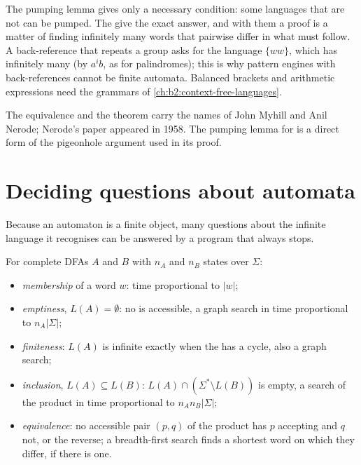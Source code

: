 The pumping lemma gives only a necessary condition: some languages that are not  can be pumped. The 
give the exact answer, and with them a proof is a matter of finding infinitely many words that pairwise differ in what
must follow. A back-reference that repeats a group asks for the language $\{ww\}$, which has infinitely many 
(by $a^ib$, as for palindromes); this is why pattern engines with back-references cannot be finite automata. Balanced
brackets and arithmetic expressions need the grammars of \cref{ch:b2:context-free-languages}.

\begin{history}
The equivalence and the theorem carry the names of John Myhill and Anil Nerode; Nerode's paper appeared in 1958. The
pumping lemma for  is a direct form of the pigeonhole argument used in its proof.
\end{history}

\section{Deciding questions about automata}\label{sec:b2:regular-languages:decisions}

Because an automaton is a finite object, many questions about the infinite language it recognises can be answered by a
program that always stops.

\begin{proposition}\label{prop:b2:regular-languages:decisions}
For complete DFAs $A$ and $B$ with $n_A$ and $n_B$ states over $\Sigma$:
\begin{itemize}
\item \emph{membership} of a word $w$: time proportional to $|w|$;
\item \emph{emptiness}, $L(A) = \emptyset$: no  is accessible, a graph search in time proportional to
$n_A|\Sigma|$;
\item \emph{finiteness}: $L(A)$ is infinite exactly when the  has a cycle, also a graph search;
\item \emph{inclusion}, $L(A) \subseteq L(B)$: $L(A) \cap (\Sigma^* \setminus L(B))$ is empty, a search of the product
in time proportional to $n_A n_B |\Sigma|$;
\item \emph{equivalence}: no accessible pair $(p, q)$ of the product has $p$ accepting and $q$ not, or the reverse; a
breadth-first search finds a shortest word on which they differ, if there is one.
\end{itemize}
\end{proposition}


